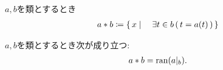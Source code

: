 	\begin{screen}
		\begin{dfn}[像・原像]
			$a,b$を類とするとき
			\begin{align}
				a \ast b \coloneqq \left\{\, x \mid \quad \exists t \in b\, (\, t=a(t)\, )\, \right\} 
			\end{align}
		\end{dfn}
	\end{screen}
	
	\begin{screen}
		\begin{thm}[像は制限写像の値域に等しい]
			$a,b$を類とするとき次が成り立つ:
			\begin{align}
				a \ast b = \operatorname*{ran}(a|_b).
			\end{align}
		\end{thm}
	\end{screen}